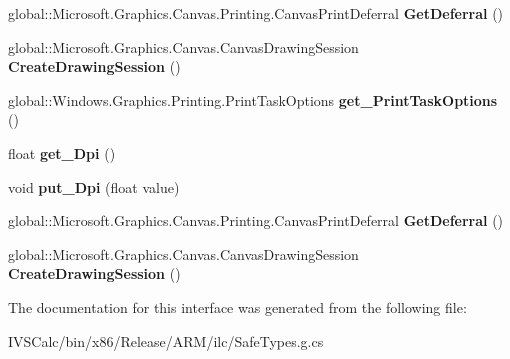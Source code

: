 \begin{DoxyCompactItemize}
global\+::\+Microsoft.\+Graphics.\+Canvas.\+Printing.\+Canvas\+Print\+Deferral {\bfseries Get\+Deferral} ()
\item 
\mbox{\label{interface_microsoft_1_1_graphics_1_1_canvas_1_1_printing_1_1_i_canvas_print_event_args_a638c3a913bba3112ce24903cdff62df6}} 
global\+::\+Microsoft.\+Graphics.\+Canvas.\+Canvas\+Drawing\+Session {\bfseries Create\+Drawing\+Session} ()
\item 
\mbox{\label{interface_microsoft_1_1_graphics_1_1_canvas_1_1_printing_1_1_i_canvas_print_event_args_a71ce18a370233ad4a96b04294e81d699}} 
global\+::\+Windows.\+Graphics.\+Printing.\+Print\+Task\+Options {\bfseries get\+\_\+\+Print\+Task\+Options} ()
\item 
\mbox{\label{interface_microsoft_1_1_graphics_1_1_canvas_1_1_printing_1_1_i_canvas_print_event_args_a904d227a056eff386ed0a743b040faad}} 
float {\bfseries get\+\_\+\+Dpi} ()
\item 
\mbox{\label{interface_microsoft_1_1_graphics_1_1_canvas_1_1_printing_1_1_i_canvas_print_event_args_af46144e28207739e9392d369d6619b02}} 
void {\bfseries put\+\_\+\+Dpi} (float value)
\item 
\mbox{\label{interface_microsoft_1_1_graphics_1_1_canvas_1_1_printing_1_1_i_canvas_print_event_args_ab56989a826e9dc05d710c2959e2bb1a6}} 
global\+::\+Microsoft.\+Graphics.\+Canvas.\+Printing.\+Canvas\+Print\+Deferral {\bfseries Get\+Deferral} ()
\item 
\mbox{\label{interface_microsoft_1_1_graphics_1_1_canvas_1_1_printing_1_1_i_canvas_print_event_args_a638c3a913bba3112ce24903cdff62df6}} 
global\+::\+Microsoft.\+Graphics.\+Canvas.\+Canvas\+Drawing\+Session {\bfseries Create\+Drawing\+Session} ()
\end{DoxyCompactItemize}


The documentation for this interface was generated from the following file\+:\begin{DoxyCompactItemize}
\item 
I\+V\+S\+Calc/bin/x86/\+Release/\+A\+R\+M/ilc/Safe\+Types.\+g.\+cs\end{DoxyCompactItemize}
